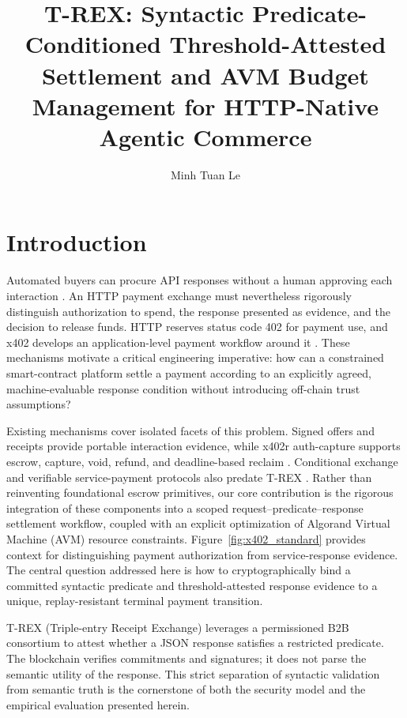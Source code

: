 \documentclass[fleqn,10pt,lineno]{wlpeerj}
\title{T-REX: Syntactic Predicate-Conditioned Threshold-Attested
Settlement and AVM Budget Management for HTTP-Native Agentic Commerce}
\author[1]{Minh Tuan Le}
\affil[1]{Faculty of Electrical and Electronics Engineering, Hanoi Open University, Hanoi 10000, Vietnam}
\begin{document}
\flushbottom
\maketitle
\thispagestyle{empty}

\section{Introduction}
Automated buyers can procure API responses without a human approving each interaction \citep{lcta,CPMMHuang2026}. An HTTP payment exchange must nevertheless rigorously distinguish authorization to spend, the response presented as evidence, and the decision to release funds. HTTP reserves status code 402 for payment use, and x402 develops an application-level payment workflow around it \citep{HTTP9110,x402}. These mechanisms motivate a critical engineering imperative: how can a constrained smart-contract platform settle a payment according to an explicitly agreed, machine-evaluable response condition without introducing off-chain trust assumptions?

Existing mechanisms cover isolated facets of this problem. Signed offers and receipts provide portable interaction evidence, while x402r auth-capture supports escrow, capture, void, refund, and deadline-based reclaim \citep{x402_ext,X402EscrowSpec}. Conditional exchange and verifiable service-payment protocols also predate T-REX \citep{asokan2004,rcsp}. Rather than reinventing foundational escrow primitives, our core contribution is the rigorous integration of these components into a scoped request--predicate--response settlement workflow, coupled with an explicit optimization of Algorand Virtual Machine (AVM) resource constraints. Figure~\ref{fig:x402_standard} provides context for distinguishing payment authorization from service-response evidence. The central question addressed here is how to cryptographically bind a committed syntactic predicate and threshold-attested response evidence to a unique, replay-resistant terminal payment transition.

T-REX (Triple-entry Receipt Exchange) leverages a permissioned B2B consortium to attest whether a JSON response satisfies a restricted predicate. The blockchain verifies commitments and signatures; it does not parse the semantic utility of the response. This strict separation of syntactic validation from semantic truth is the cornerstone of both the security model and the empirical evaluation presented herein.
\end{document}

